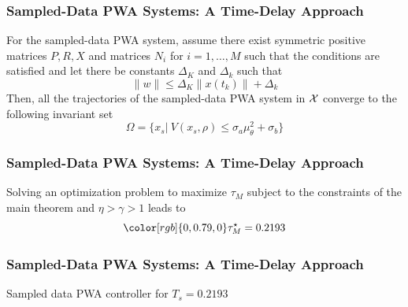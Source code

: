 \documentclass{beamer}
\newcommand{\green}{\color[rgb]{0,0.79,0}}
\newcommand{\beq}{\begin{equation*}}
\newcommand{\eeq}{\end{equation*}}
\begin{document}
  \frame
  {
    \frametitle{Sampled-Data PWA Systems: A Time-Delay Approach}
\begin{theorem}[6.1]
For the sampled-data PWA system, assume there exist symmetric positive matrices $P,R,X$ and matrices $N_i$ for $i=1,\ldots,M$ such that the conditions are satisfied and let there be constants $\Delta_K$ and $\Delta_k$ such that
\beq
\|w\|\leq \Delta_K\|x(t_k)\|+\Delta_k
\eeq
Then, all the trajectories of the sampled-data PWA system  in ${\cal X}$ converge to the following invariant set
\beq
\Omega = \{x_s|\ V(x_s,\rho)\leq \sigma_a\mu_\theta^2+\sigma_b \}
\eeq
\end{theorem}
}

\frame
  {  
    \frametitle{Sampled-Data PWA Systems: A Time-Delay Approach}
Solving an optimization problem to maximize $\tau_M$ subject to the constraints of the main theorem and $\eta>\gamma>1$ leads to
\beq
{\green \tau_M^\star = 0.2193 }
\eeq
}

\frame
  {  
  \frametitle{Sampled-Data PWA Systems: A Time-Delay Approach}
\centerline{}
\centerline{Sampled data PWA controller for $T_s=0.2193$}    
}
\end{document}
